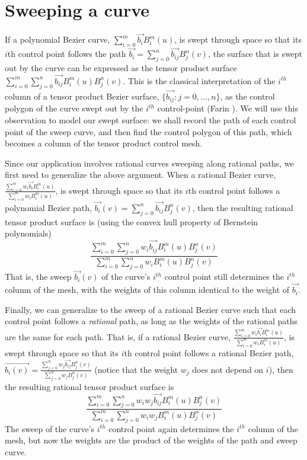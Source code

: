 \documentclass[times]{article}
\begin{document}
\section{Sweeping a curve}
\label{sec:theory}

If a polynomial Bezier curve, $\sum_{i=0}^{m} \vec{b_i} B_{i}^{m}(u)$,
is swept through space so that its $i$th control point follows the path 
$\vec{b_i} = \sum_{j=0}^{n} \vec{b_{ij}} B_{j}^{n}(v)$,
the surface that is swept out by the curve
can be expressed as the tensor product surface 
$\sum_{i=0}^{m} \sum_{j=0}^{n} \vec{b_{ij}} B_{i}^{m}(u) B_{j}^{n}(v)$.
This is the classical interpretation of the $i^{th}$ column of a tensor
product Bezier surface, $\{\vec{b_{ij}}: j=0,\ldots,n\}$, 
as the control polygon of the curve swept out by the $i^{th}$ control-point
(Farin \cite{farin93}).
We will use this observation to model our swept surface:
we shall record the path of each control point of the
sweep curve, and then find the control polygon
of this path, which becomes a column of the tensor product control mesh.

Since our application involves rational curves sweeping along rational paths,
we first need to generalize the above argument.
When a rational Bezier curve,
$\frac{\sum_{i=0}^{m} w_i \vec{b_i} B_i^{m}(u)}{\sum_{i=0}^{m} w_i B_i^{m}(u)}$,
is swept through space so that its $i$th control point follows
a polynomial Bezier path, 
$\vec{b_{i}}(v) = \sum_{j=0}^{n} \vec{b_{ij}} B_{j}^{n}(v)$,
then the resulting rational tensor product surface is
(using the convex hull property of Bernstein polynomials)
\[
\frac{\sum_{i=0}^{m} \sum_{j=0}^n w_i \vec{b_{ij}} B_i^{m}(u) B_j^n(v)}
{\sum_{i=0}^{m} \sum_{j=0}^n  w_i B_i^{m}(u) B_j^n(v)}
\]
That is, the sweep $\vec{b_{i}}(v)$ of the curve's $i^{th}$ control point still
determines the $i^{th}$ column of the mesh,
with the weights of this column identical to the weight of $\vec{b_i}$.

Finally, we can generalize to the sweep of a rational Bezier
curve such that each control point follows a {\em rational} path,
as long as the weights of the rational paths are the same for each path.
That is, if a rational Bezier curve,
$\frac{\sum_{i=0}^{m} w_i \vec{b_i} B_i^{m}(u)}{\sum_{i=0}^{m} w_i B_i^{m}(u)}$,
is swept through space so that its $i$th control point follows
a rational Bezier path, 
$\vec{b_i(v)} = \frac{\sum_{j=0}^{n} w_j \vec{b_{ij}} B_{j}^{n}(v)}
{\sum_{j=0}^{n} w_j B_{j}^{n}(v)}$
(notice that the weight $w_j$ does not depend on $i$),
then the resulting rational tensor product surface is
\begin{equation}
\label{eq:ratrat}
\frac{\sum_{i=0}^{m} \sum_{j=0}^n w_i w_j \vec{b_{ij}} B_i^{m}(u) B_j^n(v)}
{\sum_{i=0}^{m} \sum_{j=0}^n w_i w_j B_i^{m}(u) B_j^n(v)}
\end{equation}
The sweep of the curve's $i^{th}$ control point again determines the
$i^{th}$ column of the mesh,
but now the weights are the product of the weights of the path and sweep curve.
\end{document}
